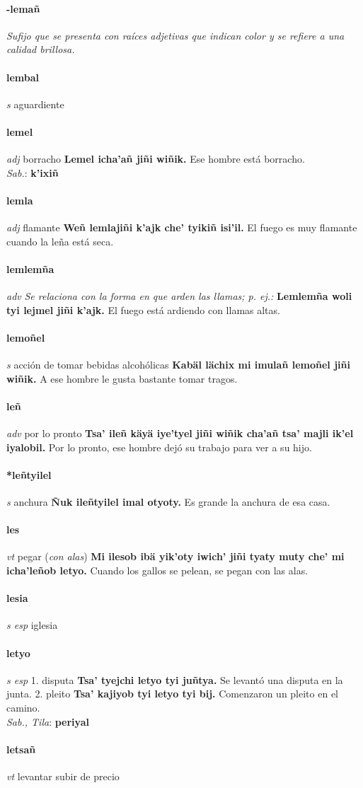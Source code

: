 \documentclass{scrbook}
\newcommand{\entry}[1]{\paragraph{#1}}
\newcommand{\onedefinition}[1]{#1.}
\newcommand{\nontranslationdef}[1]{\textit{#1}}
\newcommand{\partofspeech}[1]{\textit{#1}}
\newcommand{\spanishtranslation}[1]{#1}
\newcommand{\clarification}[1]{(\textit{#1})}
\newcommand{\cholexample}[1]{\textbf{#1}}
\newcommand{\exampletranslation}[1]{#1}
\newcommand{\dialectvariant}[1]{\\\textit{#1}:}
\newcommand{\dialectword}[1]{\textbf{#1}}
\begin{document}
\begin{multicols}{2}
\entry{-lemañ}
\nontranslationdef{Sufijo que se presenta con raíces adjetivas que indican color y se refiere a una calidad brillosa.}

\entry{lembal}
\partofspeech{s}
\spanishtranslation{aguardiente}

\entry{lemel}
\partofspeech{adj}
\spanishtranslation{borracho}
\cholexample{Lemel icha'añ jiñi wiñik.}
\exampletranslation{Ese hombre está borracho.}
\dialectvariant{Sab.}
\dialectword{k'ixiñ}

\entry{lemla}
\partofspeech{adj}
\spanishtranslation{flamante}
\cholexample{Weñ lemlajiñi k'ajk che' tyikiñ isi'il.}
\exampletranslation{El fuego es muy flamante cuando la leña está seca.}

\entry{lemlemña}
\partofspeech{adv}
\nontranslationdef{Se relaciona con la forma en que arden las llamas; p. ej.:}
\cholexample{Lemlemña woli tyi lejmel jiñi k'ajk.}
\exampletranslation{El fuego está ardiendo con llamas altas.}

\entry{lemoñel}
\partofspeech{s}
\spanishtranslation{acción de tomar bebidas alcohólicas}
\cholexample{Kabäl lächix mi imulañ lemoñel jiñi wiñik.}
\exampletranslation{A ese hombre le gusta bastante tomar tragos.}

\entry{leñ}
\partofspeech{adv}
\spanishtranslation{por lo pronto}
\cholexample{Tsa' ileñ käyä iye'tyel jiñi wiñik cha'añ tsa' majli ik'el iyalobil.}
\exampletranslation{Por lo pronto, ese hombre dejó su trabajo para ver a su hijo.}

\entry{*leñtyilel}
\partofspeech{s}
\spanishtranslation{anchura}
\cholexample{Ñuk ileñtyilel imal otyoty.}
\exampletranslation{Es grande la anchura de esa casa.}

\entry{les}
\partofspeech{vt}
\spanishtranslation{pegar}
\clarification{con alas}
\cholexample{Mi ilesob ibä yik'oty iwich' jiñi tyaty muty che' mi icha'leñob letyo.}
\exampletranslation{Cuando los gallos se pelean, se pegan con las alas.}

\entry{lesia}
\partofspeech{s esp}
\spanishtranslation{iglesia}

\entry{letyo}
\partofspeech{s esp}
\onedefinition{1}
\spanishtranslation{disputa}
\cholexample{Tsa' tyejchi letyo tyi juñtya.}
\exampletranslation{Se levantó una disputa en la junta.}
\onedefinition{2}
\spanishtranslation{pleito}
\cholexample{Tsa' kajiyob tyi letyo tyi bij.}
\exampletranslation{Comenzaron un pleito en el camino.}
\dialectvariant{Sab., Tila}
\dialectword{periyal}

\entry{letsañ}
\partofspeech{vt}
\spanishtranslation{levantar}
\spanishtranslation{subir de precio}


\end{multicols}
\end{document}
